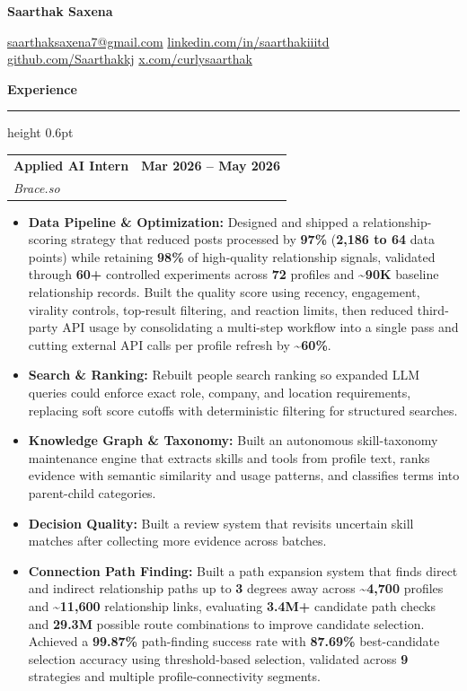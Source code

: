 \documentclass[10pt,letterpaper]{article}
\makeatletter
\newcommand{\name}[1]{%
  {\Large\bfseries #1}\par\vspace{1pt}
}
\newcommand{\contact}[1]{%
  {\footnotesize #1}\par\vspace{4pt}
}
\newcommand{\sectiontitle}[1]{%
  \vspace{3pt}
  {\normalsize\bfseries\color{accent} #1}\par
  \vspace{1pt}
  {\color{accent}\hrule height 0.6pt}
  \vspace{2pt}
}
\newcommand{\entry}[4]{%
  \begin{tabularx}{\textwidth}{@{}X r@{}}
    {\bfseries #1} & {\footnotesize\bfseries #2} \\
    {\footnotesize\textit{#3}} & {\footnotesize #4}
  \end{tabularx}
  \vspace{1pt}
}
\newenvironment{tightitems}{%
  \begin{itemize}
    \setlength{\itemsep}{0pt}
    \setlength{\parskip}{0pt}
    \setlength{\parsep}{0pt}
    \setlength{\topsep}{1pt}
    \setlength{\leftmargin}{12pt}
}{%
  \end{itemize}
  \vspace{0pt}
}
\makeatother
\begin{document}
\fontsize{9.25}{10.2}\selectfont
\raggedright

\name{Saarthak Saxena}
\contact{\href{mailto:saarthaksaxena7@gmail.com}{saarthaksaxena7@gmail.com} \textbar{}
\href{https://www.linkedin.com/in/saarthakiiitd/}{linkedin.com/in/saarthakiiitd} \textbar{}
\href{https://github.com/Saarthakkj}{github.com/Saarthakkj} \textbar{}
\href{https://x.com/curlysaarthak}{x.com/curlysaarthak}}

\sectiontitle{Experience}

\entry{Applied AI Intern}{\textbf{Mar 2026 -- May 2026}}{Brace.so}{}
\begin{tightitems}
  \item \textbf{Data Pipeline \& Optimization:} Designed and shipped a relationship-scoring strategy that reduced posts processed by \textbf{97\%} (\textbf{2,186 to 64} data points) while retaining \textbf{98\%} of high-quality relationship signals, validated through \textbf{60+} controlled experiments across \textbf{72} profiles and \textbf{\textasciitilde{}90K} baseline relationship records. Built the quality score using recency, engagement, virality controls, top-result filtering, and reaction limits, then reduced third-party API usage by consolidating a multi-step workflow into a single pass and cutting external API calls per profile refresh by \textbf{\textasciitilde{}60\%}.
  \item \textbf{Search \& Ranking:} Rebuilt people search ranking so expanded LLM queries could enforce exact role, company, and location requirements, replacing soft score cutoffs with deterministic filtering for structured searches.
  \item \textbf{Knowledge Graph \& Taxonomy:} Built an autonomous skill-taxonomy maintenance engine that extracts skills and tools from profile text, ranks evidence with semantic similarity and usage patterns, and classifies terms into parent-child categories.
  \item \textbf{Decision Quality:} Built a review system that revisits uncertain skill matches after collecting more evidence across batches.
  \item \textbf{Connection Path Finding:} Built a path expansion system that finds direct and indirect relationship paths up to \textbf{3} degrees away across \textbf{\textasciitilde{}4,700} profiles and \textbf{\textasciitilde{}11,600} relationship links, evaluating \textbf{3.4M+} candidate path checks and \textbf{29.3M} possible route combinations to improve candidate selection. Achieved a \textbf{99.87\%} path-finding success rate with \textbf{87.69\%} best-candidate selection accuracy using threshold-based selection, validated across \textbf{9} strategies and multiple profile-connectivity segments.
\end{tightitems}
\end{document}
